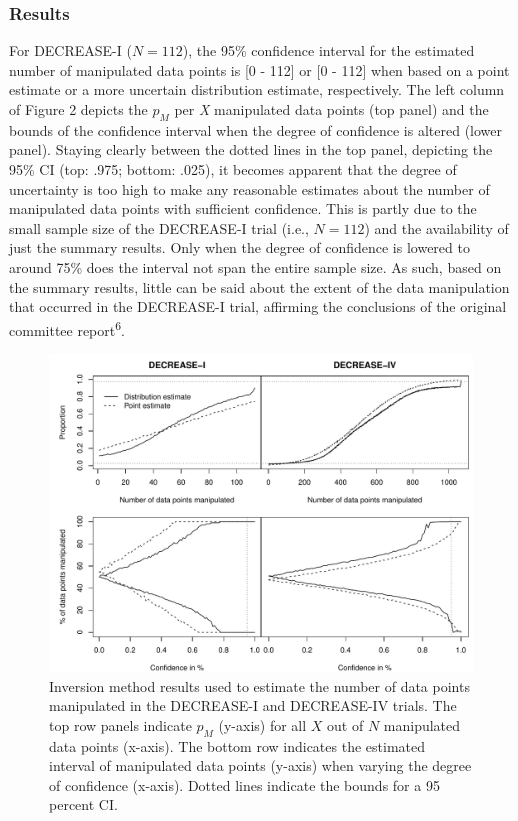 \documentclass[]{article}
\begin{document}
\subsubsection{Results}\label{results-2}

For DECREASE-I (\(N=112\)), the 95\% confidence interval for the
estimated number of manipulated data points is {[}0 - 112{]} or {[}0 -
112{]} when based on a point estimate or a more uncertain distribution
estimate, respectively. The left column of Figure 2 depicts the \(p_M\)
per \emph{X} manipulated data points (top panel) and the bounds of the
confidence interval when the degree of confidence is altered (lower
panel). Staying clearly between the dotted lines in the top panel,
depicting the 95\% CI (top: .975; bottom: .025), it becomes apparent
that the degree of uncertainty is too high to make any reasonable
estimates about the number of manipulated data points with sufficient
confidence. This is partly due to the small sample size of the
DECREASE-I trial (i.e., \(N=112\)) and the availability of just the
summary results. Only when the degree of confidence is lowered to around
75\% does the interval not span the entire sample size. As such, based
on the summary results, little can be said about the extent of the data
manipulation that occurred in the DECREASE-I trial, affirming the
conclusions of the original committee report\textsuperscript{6}.

\begin{figure}

{\centering \includegraphics[width=0.8\linewidth]{../figures/fig2} 

}

\caption{Inversion method results used to estimate the number of data points manipulated in the DECREASE-I and DECREASE-IV trials. The top row panels indicate $p_M$ (y-axis) for all $X$ out of $N$ manipulated data points (x-axis). The bottom row indicates the estimated interval of manipulated data points (y-axis) when varying the degree of confidence (x-axis). Dotted lines indicate the bounds for a 95 percent CI.}\label{fig:figure 3}
\end{figure}
\end{document}
